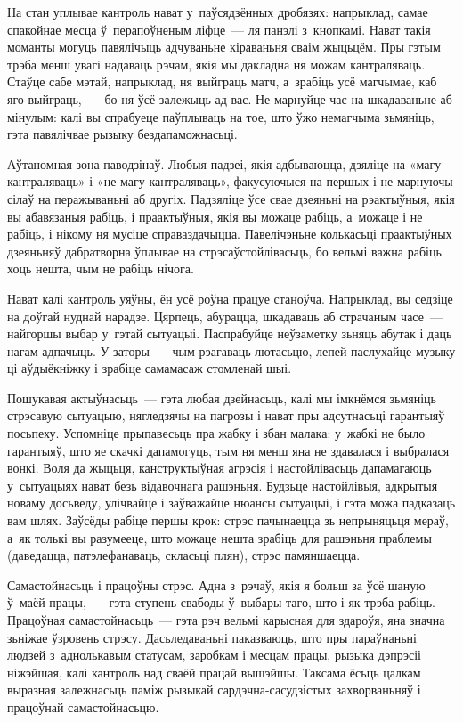 На стан уплывае кантроль нават у~паўсядзённых дробязях: напрыклад, самае спакойнае месца ў~перапоўненым ліфце~--- ля панэлі з~кнопкамі. Нават такія моманты могуць павялічыць адчуваньне кіраваньня сваім жыцьцём. Пры гэтым трэба менш увагі надаваць рэчам, якія мы дакладна ня можам кантраляваць. Стаўце сабе мэтай, напрыклад, ня выйграць матч, а~зрабіць усё магчымае, каб яго выйграць,~--- бо ня ўсё залежыць ад вас. Не марнуйце час на шкадаваньне аб мінулым: калі вы спрабуеце паўплываць на тое, што ўжо немагчыма зьмяніць, гэта павялічвае рызыку бездапаможнасьці.

Аўтаномная зона паводзінаў. Любыя падзеі, якія адбываюцца, дзяліце на «магу кантраляваць» і «не магу кантраляваць», факусуючыся на першых і не марнуючы сілаў на перажываньні аб другіх. Падзяліце ўсе свае дзеяньні на рэактыўныя, якія вы абавязаныя рабіць, і праактыўныя, якія вы можаце рабіць, а~можаце і не рабіць, і нікому ня мусіце справаздачыцца. Павелічэньне колькасьці праактыўных дзеяньняў дабратворна ўплывае на стрэсаўстойлівасьць, бо вельмі важна рабіць хоць нешта, чым не рабіць нічога.

Нават калі кантроль уяўны, ён усё роўна працуе станоўча. Напрыклад, вы седзіце на доўгай нуднай нарадзе. Цярпець, абурацца, шкадаваць аб страчаным часе~--- найгоршы выбар у~гэтай сытуацыі. Паспрабуйце неўзаметку зьняць абутак і даць нагам адпачыць. У заторы~--- чым рэагаваць лютасьцю, лепей паслухайце музыку ці аўдыёкніжку і зрабіце самамасаж стомленай шыі.

Пошукавая актыўнасьць~--- гэта любая дзейнасьць, калі мы імкнёмся зьмяніць стрэсавую сытуацыю, нягледзячы на пагрозы і нават пры адсутнасьці гарантыяў посьпеху. Успомніце прыпавесьць пра жабку і збан малака: у~жабкі не было гарантыяў, што яе скачкі дапамогуць, тым ня менш яна не здавалася і выбралася вонкі. Воля да жыцьця, канструктыўная агрэсія і настойлівасьць дапамагаюць у~сытуацыях нават безь відавочнага рашэньня. Будзьце настойлівыя, адкрытыя новаму досьведу, улічвайце і заўважайце нюансы сытуацыі, і гэта можа падказаць вам шлях. Заўсёды рабіце першы крок: стрэс пачынаецца зь непрыняцьця мераў, а~як толькі вы разумееце, што можаце нешта зрабіць для рашэньня праблемы (даведацца, патэлефанаваць, скласьці плян), стрэс памяншаецца.

Самастойнасьць і працоўны стрэс. Адна з~рэчаў, якія я больш за ўсё шаную ў~маёй працы,~--- гэта ступень свабоды ў~выбары таго, што і як трэба рабіць. Працоўная самастойнасьць~--- гэта рэч вельмі карысная для здароўя, яна значна зьніжае ўзровень стрэсу. Дасьледаваньні паказваюць, што пры параўнаньні людзей з~аднолькавым статусам, заробкам і месцам працы, рызыка дэпрэсіі ніжэйшая, калі кантроль над сваёй працай вышэйшы. Таксама ёсьць цалкам выразная залежнасьць паміж рызыкай сардэчна-сасудзістых захворваньняў і працоўнай самастойнасьцю.

